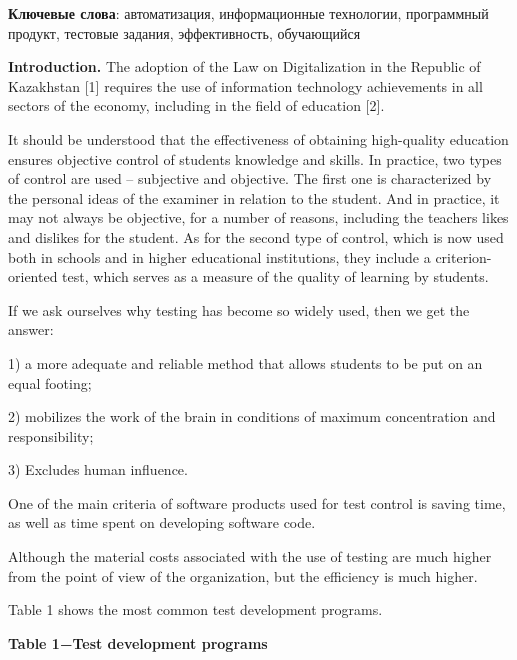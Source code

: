 {\bfseries Ключевые слова}: автоматизация, информационные технологии,
программный продукт, тестовые задания, эффективность, обучающийся

{\bfseries Introduction.} The adoption of the Law on Digitalization in the
Republic of Kazakhstan {[}1{]} requires the use of information
technology achievements in all sectors of the economy, including in the
field of education {[}2{]}.

It should be understood that the effectiveness of obtaining high-quality
education ensures objective control of students\textquotesingle{}
knowledge and skills. In practice, two types of control are used --
subjective and objective. The first one is characterized by the personal
ideas of the examiner in relation to the student. And in practice, it
may not always be objective, for a number of reasons, including the
teacher\textquotesingle s likes and dislikes for the student. As for the
second type of control, which is now used both in schools and in higher
educational institutions, they include a criterion-oriented test, which
serves as a measure of the quality of learning by students.

If we ask ourselves why testing has become so widely used, then we get
the answer:

1) a more adequate and reliable method that allows students to be put on
an equal footing;

2) mobilizes the work of the brain in conditions of maximum
concentration and responsibility;

3) Excludes human influence.

One of the main criteria of software products used for test control is
saving time, as well as time spent on developing software code.

Although the material costs associated with the use of testing are much
higher from the point of view of the organization, but the efficiency is
much higher.

Table 1 shows the most common test development programs.

{\bfseries Table 1−Test development programs}

